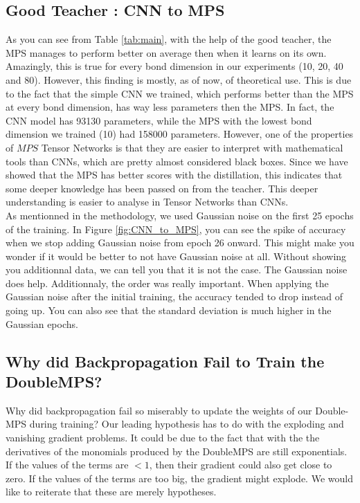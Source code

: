 \documentclass{article}
\theoremstyle{definition}
\theoremstyle{definition}
\begin{document}
\subsection{Good Teacher : CNN to MPS}
As you can see from Table \ref{tab:main}, with the help of the good teacher, the MPS manages to perform better on average then when it learns on its own. Amazingly, this is true for every bond dimension in our experiments (10, 20, 40 and 80). However, this finding is mostly, as of now, of theoretical use. This is due to the fact that the simple CNN we trained, which performs better than the MPS at every bond dimension, has way less parameters then the MPS. In fact, the CNN model has 93130 parameters, while the MPS with the lowest bond dimension we trained (10) had 158000 parameters. However, one of the properties of $MPS$ Tensor Networks is that they are easier to interpret with mathematical tools than CNNs, which are pretty almost considered black boxes. Since we have showed that the MPS has better scores with the distillation, this indicates that some deeper knowledge has been passed on from the teacher. This deeper understanding is easier to analyse in Tensor Networks than CNNs. \\

As mentionned in the methodology, we used Gaussian noise on the first 25 epochs of the training. In Figure \ref{fig:CNN_to_MPS}, you can see the spike of accuracy when we stop adding Gaussian noise from epoch 26 onward. This might make you wonder if it would be better to not have Gaussian noise at all. Without showing you additionnal data, we can tell you that it is not the case. The Gaussian noise does help. Additionnaly, the order was really important. When applying the Gaussian noise after the initial training, the accuracy tended to drop instead of going up. You can also see that the standard deviation is much higher in the Gaussian epochs.



\subsection{Why did Backpropagation Fail to Train the DoubleMPS?}
Why did backpropagation fail so miserably to update the weights of our Double-MPS during training? Our leading hypothesis has to do with the exploding and vanishing gradient problems\cite{pascanu2013difficulty}. It could be due to the fact that with the the derivatives of the monomials produced by the DoubleMPS are still exponentials. If the values of the terms are $<1$, then their gradient could also get close to zero. If the values of the terms are too big, the gradient might explode. We would like to reiterate that these are merely hypotheses. \\
\end{document}
